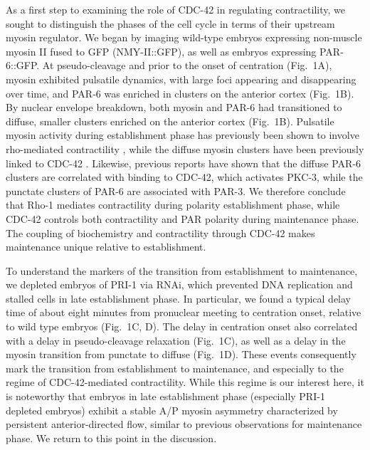\documentclass[11pt]{article}
\newcommand{\6}[1]{#1_{\text{6}}}
\newcommand{\3}[1]{#1_{\text{3}}}
\begin{document}
As a first step to examining the role of CDC-42 in regulating contractility, we sought to distinguish the phases of the cell cycle in terms of their upstream myosin regulator. We began by imaging wild-type embryos expressing non-muscle myosin II fused to GFP (NMY-II::GFP), as well as embryos expressing PAR-6::GFP. At pseudo-cleavage and prior to the onset of centration (Fig.\ 1A), myosin exhibited pulsatile dynamics, with large foci appearing and disappearing over time, and PAR-6 was enriched in clusters on the anterior cortex (Fig.\ 1B). By nuclear envelope breakdown, both myosin and PAR-6 had transitioned to diffuse, smaller clusters enriched on the anterior cortex (Fig.\ 1B). Pulsatile myosin activity during establishment phase has previously been shown to involve rho-mediated contractility \citep{michaux2018excitable, michaud2022versatile, yao2022modulating}, while the diffuse myosin clusters have been previously linked to CDC-42 \citep{motegi2006sequential}. Likewise, previous reports \citep{motegi2006sequential, rodriguez2017apkc} have shown that the diffuse PAR-6 clusters are correlated with binding to CDC-42, which activates PKC-3, while the punctate clusters of PAR-6 are associated with PAR-3. We therefore conclude that Rho-1 mediates contractility during polarity establishment phase, while CDC-42 controls both contractility and PAR polarity during maintenance phase. The coupling of biochemistry and contractility through CDC-42 makes maintenance unique relative to establishment.

To understand the markers of the transition from establishment to maintenance, we depleted embryos of PRI-1 via RNAi, which prevented DNA replication and stalled cells in late establishment phase. In particular, we found a typical delay time of about eight minutes from pronuclear meeting to centration onset, relative to wild type embryos (Fig.\ 1C, D). The delay in centration onset also correlated with a delay in pseudo-cleavage relaxation (Fig.\ 1C), as well as a delay in the myosin transition from punctate to diffuse (Fig.\ 1D). These events consequently mark the transition from establishment to maintenance, and especially to the regime of CDC-42-mediated contractility. While this regime is our interest here, it is noteworthy that embryos in late establishment phase (especially PRI-1 depleted embryos) exhibit a stable A/P myosin asymmetry characterized by persistent anterior-directed flow, similar to previous observations for maintenance phase. We return to this point in the discussion.
\end{document}
